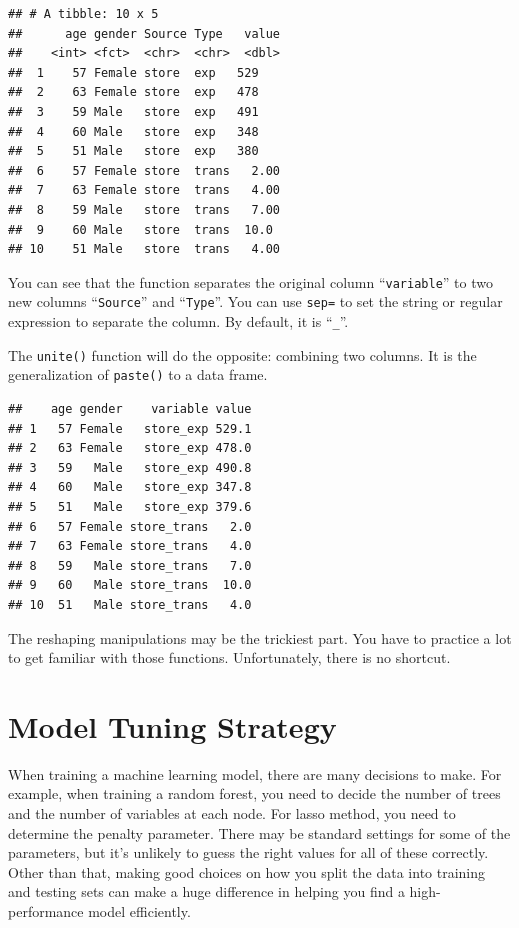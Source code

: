 \documentclass[12pt,]{krantz}
\newenvironment{Shaded}{\begin{snugshade}}{\end{snugshade}}
\newcommand{\KeywordTok}[1]{\textcolor[rgb]{0.13,0.29,0.53}{\textbf{#1}}}
\newcommand{\DataTypeTok}[1]{\textcolor[rgb]{0.13,0.29,0.53}{#1}}
\newcommand{\StringTok}[1]{\textcolor[rgb]{0.31,0.60,0.02}{#1}}
\newcommand{\OperatorTok}[1]{\textcolor[rgb]{0.81,0.36,0.00}{\textbf{#1}}}
\newcommand{\NormalTok}[1]{#1}
\theoremstyle{definition}
\theoremstyle{definition}
\theoremstyle{definition}
\theoremstyle{remark}
\begin{document}
\begin{verbatim}
## # A tibble: 10 x 5
##      age gender Source Type   value
##    <int> <fct>  <chr>  <chr>  <dbl>
##  1    57 Female store  exp   529   
##  2    63 Female store  exp   478   
##  3    59 Male   store  exp   491   
##  4    60 Male   store  exp   348   
##  5    51 Male   store  exp   380   
##  6    57 Female store  trans   2.00
##  7    63 Female store  trans   4.00
##  8    59 Male   store  trans   7.00
##  9    60 Male   store  trans  10.0 
## 10    51 Male   store  trans   4.00
\end{verbatim}

You can see that the function separates the original column
``\texttt{variable}'' to two new columns ``\texttt{Source}'' and
``\texttt{Type}''. You can use \texttt{sep=} to set the string or
regular expression to separate the column. By default, it is
``\texttt{\_}''.

The \texttt{unite()} function will do the opposite: combining two
columns. It is the generalization of \texttt{paste()} to a data frame.

\begin{Shaded}
\end{Shaded}

\begin{verbatim}
##    age gender    variable value
## 1   57 Female   store_exp 529.1
## 2   63 Female   store_exp 478.0
## 3   59   Male   store_exp 490.8
## 4   60   Male   store_exp 347.8
## 5   51   Male   store_exp 379.6
## 6   57 Female store_trans   2.0
## 7   63 Female store_trans   4.0
## 8   59   Male store_trans   7.0
## 9   60   Male store_trans  10.0
## 10  51   Male store_trans   4.0
\end{verbatim}

The reshaping manipulations may be the trickiest part. You have to
practice a lot to get familiar with those functions. Unfortunately,
there is no shortcut.

\chapter{Model Tuning Strategy}\label{model-tuning-strategy}

When training a machine learning model, there are many decisions to
make. For example, when training a random forest, you need to decide the
number of trees and the number of variables at each node. For lasso
method, you need to determine the penalty parameter. There may be
standard settings for some of the parameters, but it's unlikely to guess
the right values for all of these correctly. Other than that, making
good choices on how you split the data into training and testing sets
can make a huge difference in helping you find a high-performance model
efficiently.
\end{document}
